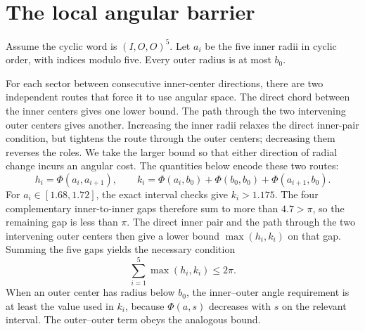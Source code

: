 \documentclass[11pt]{article}
\theoremstyle{definition}
\newcommand{\ph}{\Phi}
\begin{document}
\section{The local angular barrier}\label{sec:local}

Assume the cyclic word is $(I,O,O)^5$. Let $a_i$ be the five inner radii in cyclic order, with indices modulo five. Every outer radius is at most $b_0$.

For each sector between consecutive inner-center directions, there are two independent routes that force it to use angular space. The direct chord between the inner centers gives one lower bound. The path through the two intervening outer centers gives another. Increasing the inner radii relaxes the direct inner-pair condition, but tightens the route through the outer centers; decreasing them reverses the roles. We take the larger bound so that either direction of radial change incurs an angular cost. The quantities below encode these two routes:
\[
 h_i=\ph(a_i,a_{i+1}),\qquad
 k_i=\ph(a_i,b_0)+\ph(b_0,b_0)+\ph(a_{i+1},b_0).
\]
For $a_i\in[1.68,1.72]$, the exact interval checks give $k_i>1.175$. The four complementary inner-to-inner gaps therefore sum to more than $4.7>\pi$, so the remaining gap is less than $\pi$. The direct inner pair and the path through the two intervening outer centers then give a lower bound $\max(h_i,k_i)$ on that gap. Summing the five gaps yields the necessary condition
\begin{equation}\label{eq:budget}
 \sum_{i=1}^5\max(h_i,k_i)\le2\pi.
\end{equation}
When an outer center has radius below $b_0$, the inner--outer angle requirement is at least the value used in $k_i$, because $\ph(a,s)$ decreases with $s$ on the relevant interval. The outer--outer term obeys the analogous bound.
\end{document}
